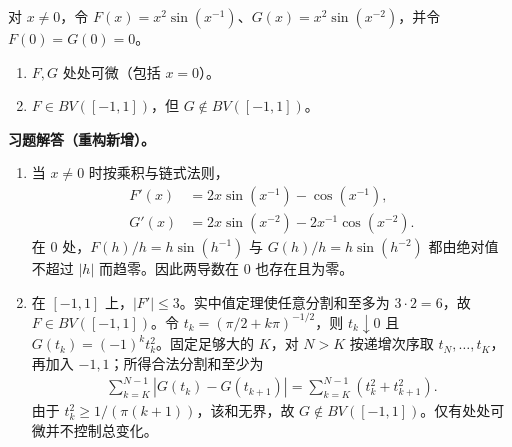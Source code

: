 \documentclass[../../main.tex]{subfiles}%
\begin{document}
\begin{exercise}\label{exercise:ch03-differentiable-non-bv}
对 $x\ne0$，令 $F(x)=x^2\sin(x^{-1})$、$G(x)=x^2\sin(x^{-2})$，并令 $F(0)=G(0)=0$。
\begin{enumerate}
\item\label{item:ch03-oscillatory-differentiability} $F,G$ 处处可微（包括 $x=0$）。
\item\label{item:ch03-oscillatory-variation} $F\in BV([-1,1])$，但 $G\notin BV([-1,1])$。
\end{enumerate}
\end{exercise}
\begin{solution}
\label{solution:ch03-differentiable-non-bv}
\textbf{习题解答（重构新增）。}\begin{enumerate}
\item 当 $x\ne0$ 时按乘积与链式法则，
\begin{align*}
F'(x)&=2x\sin(x^{-1})-\cos(x^{-1}),\\
G'(x)&=2x\sin(x^{-2})-2x^{-1}\cos(x^{-2}).
\end{align*}
在 $0$ 处，$F(h)/h=h\sin(h^{-1})$ 与 $G(h)/h=h\sin(h^{-2})$ 都由绝对值不超过 $|h|$ 而趋零。因此两导数在 $0$ 也存在且为零。
\item 在 $[-1,1]$ 上，$|F'|\le3$。实中值定理使任意分割和至多为 $3\cdot2=6$，故 $F\in BV([-1,1])$。令 $t_k=(\pi/2+k\pi)^{-1/2}$，则 $t_k\downarrow0$ 且 $G(t_k)=(-1)^kt_k^2$。固定足够大的 $K$，对 $N>K$ 按递增次序取 $t_N,\ldots,t_K$，再加入 $-1,1$；所得合法分割和至少为
\begin{align*}
\sum_{k=K}^{N-1}|G(t_k)-G(t_{k+1})|
=\sum_{k=K}^{N-1}(t_k^2+t_{k+1}^2).
\end{align*}
由于 $t_k^2\ge1/(\pi(k+1))$，该和无界，故 $G\notin BV([-1,1])$。仅有处处可微并不控制总变化。
\end{enumerate}
\end{solution}
\end{document}
